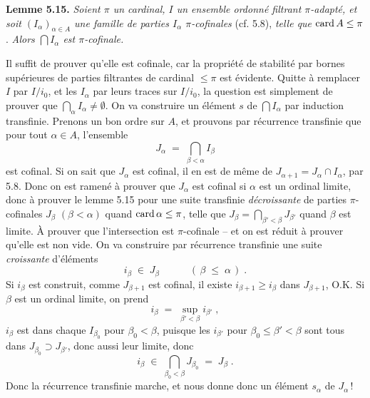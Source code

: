 
\textbf{Lemme 5.15.} \textit{Soient $\pi$ un cardinal, $I$ un ensemble ordonné filtrant $\pi$-adapté, et soit $(I_{\alpha})_{\alpha\in A}$ une famille de parties $I_{\alpha}$ $\pi$-cofinales} (cf. 5.8), \textit{telle que} $\operatorname{card} A \leq \pi$. \textit{Alors $\bigcap I_{\alpha}$ est $\pi$-cofinale.}

Il suffit de prouver qu'elle est cofinale, car la propriété de stabilité par bornes supérieures de parties filtrantes de cardinal $\leq \pi$ est évidente. Quitte à remplacer $I$ par $I/i_{0}$, et les $I_{\alpha}$ par leurs traces sur $I/i_{0}$, la question est simplement de prouver que $\bigcap_{\alpha} I_{\alpha} \neq \emptyset$. On va construire un élément $s$ de $\bigcap I_{\alpha}$ par induction transfinie. Prenons un bon ordre sur $A$, et prouvons par récurrence transfinie
que pour tout $\alpha \in A$, l'ensemble
\[
J_{\alpha} \;=\; \bigcap_{\beta<\alpha} I_{\beta}
\]
est cofinal. Si on sait que $J_{\alpha}$ est cofinal, il en est de même de $J_{\alpha+1} = J_{\alpha} \cap I_{\alpha}$, par 5.8. Donc on est ramené à prouver que $J_{\alpha}$ est cofinal si $\alpha$ est un ordinal limite, donc à prouver le lemme 5.15 pour une suite transfinie \textit{décroissante} de parties $\pi$-cofinales $J_{\beta}$ $(\beta < \alpha)$ quand $\operatorname{card} \alpha \leq \pi$, telle que $J_{\beta} = \bigcap_{\beta'<\beta} J_{\beta'}$ quand $\beta$ est limite. À prouver que l'intersection est $\pi$-cofinale -- et on est réduit à prouver qu'elle est non vide. On va construire par récurrence transfinie une suite \textit{croissante} d'éléments
\[
i_{\beta} \;\in\; J_{\beta} \qquad\quad (\, \beta \;\leq\; \alpha \,) \; .
\]
Si $i_{\beta}$ est construit, comme $J_{\beta+1}$ est cofinal, il existe $i_{\beta+1} \geq i_{\beta}$ dans $J_{\beta+1}$, O.K. Si $\beta$ est un ordinal limite, on prend
\[
i_{\beta} \;=\; \sup_{\beta'<\beta} i_{\beta'} \; ,
\]
$i_{\beta}$ est dans chaque $I_{\beta_{0}}$ pour $\beta_{0} < \beta$,
puisque les $i_{\beta'}$ pour $\beta_{0} \leq \beta' < \beta$ sont tous dans $J_{\beta_{0}} \supset J_{\beta'}$, donc aussi leur limite, donc
\[
i_{\beta} \;\in\; \bigcap_{\beta_{0}<\beta} J_{\beta_{0}} \;=\; J_{\beta} \; .
\]
Donc la récurrence transfinie marche, et nous donne donc un élément $s_{\alpha}$ de $J_{\alpha}$\,!

